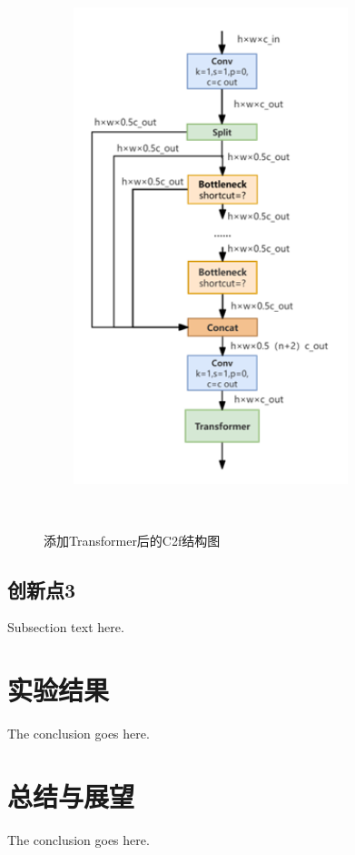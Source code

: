 \documentclass[journal]{IEEEtran}
\begin{document}
\begin{figure}[htbp] 

   \centering
   \includegraphics[width=8cm]{figures/4_4.png}
   \caption{添加Transformer后的C2f结构图} 
   \label{fig:} 
  
\end{figure} 
\subsection{创新点3}
Subsection text here.

\section{实验结果}
The conclusion goes here.

\section{总结与展望}
The conclusion goes here.

\end{document}
